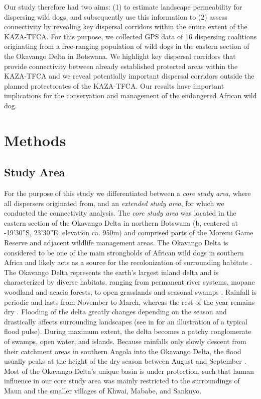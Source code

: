 \documentclass[abstract=on,10pt,a4paper,bibliography=totocnumbered]{scrartcl}
\begin{document}
Our study therefore had two aims: (1) to estimate landscape permeability for
dispersing wild dogs, and subsequently use this information to (2) assess
connectivity by revealing key dispersal corridors within the entire extent of
the KAZA-TFCA. For this purpose, we collected GPS data of 16 dispersing
coalitions originating from a free-ranging population of wild dogs in the
eastern section of the Okavango Delta in Botswana. We highlight key dispersal
corridors that provide connectivity between already established protected areas
within the KAZA-TFCA and we reveal potentially important dispersal corridors
outside the planned protectorates of the KAZA-TFCA. Our results have important
implications for the conservation and management of the endangered African wild
dog.

\newpage
\section{Methods}
\subsection{Study Area}
For the purpose of this study we differentiated between a \textit{core study
area}, where all dispersers originated from, and an \textit{extended study
area}, for which we conducted the connectivity analysis. The \textit{core study
area} was located in the eastern section of the Okavango Delta in northern
Botswana (b, centered at -19'30''S, 23'30''E; elevation ca. 950m) and comprised parts of the Moremi Game Reserve and
adjacent wildlife management areas. The Okavango Delta is considered to be one
of the main strongholds of African wild dogs in southern Africa and likely acts
as a source for the recolonization of surrounding habitats
\citep{Woodroffe.2012, Cozzi.2013}. The Okavango Delta represents the earth's
largest inland delta and is characterized by diverse habitats, ranging from
permanent river systems, mopane woodland and acacia forests, to open grasslands
and seasonal swamps \citep{Broekhuis.2013}. Rainfall is periodic and lasts from
November to March, whereas the rest of the year remains dry \citep{McNutt.1996}.
Flooding of the delta greatly changes depending on the season and drastically
affects surrounding landscapes (see  in
 for an illustration of a typical flood pulse). During
maximum extent, the delta becomes a patchy conglomerate of swamps, open water,
and islands. Because rainfalls only slowly descent from their catchment areas in
southern Angola into the Okavango Delta, the flood usually peaks at the height
of the dry season between August and September \citep{Wolski.2017}. Most of the
Okavango Delta's unique basin is under protection, such that human influence in
our core study area was mainly restricted to the surroundings of Maun and the
smaller villages of Khwai, Mababe, and Sankuyo.
\end{document}
